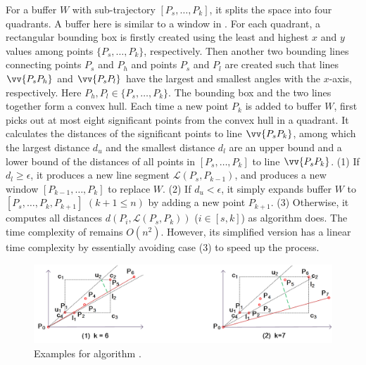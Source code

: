 For a buffer $W$ with sub-trajectory $[P_s, \ldots, P_k]$, it splits the space into four quadrants. A buffer here is similar to a window in \opwa \cite{Meratnia:Spatiotemporal}. For each quadrant, a rectangular bounding box is firstly created using the least and highest $x$ and $y$ values among points $\{P_s,\ldots,P_k\}$, respectively. Then another two bounding lines connecting points $P_s$ and $P_{h}$ and points $P_s$ and $P_{l}$ are created such that lines $\vv{P_sP_{h}}$ and $\vv{P_sP_{l}}$ have the largest and smallest angles with the $x$-axis, respectively.
Here $P_{h},P_{l} \in\{P_s,\ldots,P_k\}$. The bounding box and the two lines together form a convex hull.
Each time a new point $P_k$ is added to buffer $W$, \bqsa first picks out at most eight significant points from the convex hull in a quadrant. It calculates the distances of the significant points to line $\vv{P_sP_k}$, among which the largest distance $d_{u}$ and the smallest distance $d_l$ are an upper bound and  a lower bound of the distances of all points in $[P_s, \ldots, P_k]$ to line $\vv{P_sP_k}$.
(1) If $d_l\ge \epsilon$, it produces a new line segment $\mathcal{L}(P_{s}, P_{k-1})$, and produces a new window $[P_{k-1},\ldots,P_{k}]$ to replace $W$.
(2) If $d_u < \epsilon$, it simply expands buffer $W$ to $[P_s, \ldots, P_k, P_{k+1}]$ $(k+1\le n)$ by adding a new point $P_{k+1}$.
(3) Otherwise, it computes all distances $d(P_i, {\mathcal{L}(P_s,P_k)})$ ($i\in[s, k]$) as algorithm \dpa does.
%
The time complexity of \bqsa remains $O(n^2)$. However, its simplified version \fbqsa has a linear time complexity by essentially avoiding case (3) to speed up the process.


\begin{figure}[tb!]
	\centering
	\includegraphics[scale = 0.66]{Figures/Fig-BQS.png}
	\vspace{-1ex}
	\caption{{\small Examples for algorithm \bqsa.}}
	\label{fig:bqs}
	\vspace{-2ex}
\end{figure}


